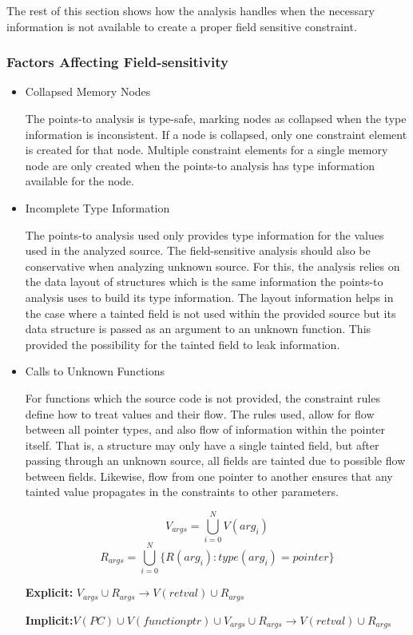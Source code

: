  The rest of this section shows how the analysis handles when the necessary
 information is not available to create a proper field sensitive constraint.

\subsubsection{Factors Affecting Field-sensitivity}
\begin{itemize}
\item{Collapsed Memory Nodes}

   The points-to analysis is type-safe, marking nodes as collapsed when the type
   information is inconsistent. If a node is collapsed, only one constraint
   element is created for that node. Multiple constraint elements for a single
   memory node are only created when the points-to analysis has type information
   available for the node.

\item{Incomplete Type Information}

   The points-to analysis used only provides type information for the values used
   in the analyzed source. The field-sensitive analysis should also be
   conservative when analyzing unknown source. For this, the analysis relies on
   the data layout of structures which is the same information the points-to
   analysis uses to build its type information. The layout information helps in
   the case where a tainted field is not used within the provided source but its
   data structure is passed as an argument to an unknown function. This provided
   the possibility for the tainted field to leak information.

\item{Calls to Unknown Functions}

For functions which the source code is not provided, the constraint rules define
how to treat values and their flow. The rules used, allow for flow between all
pointer types, and also flow of information within the pointer itself. That is,
a structure may only have a single tainted field, but after passing through an
unknown source, all fields are tainted due to possible flow between fields.
Likewise, flow from one pointer to another ensures that any tainted value
propagates in the constraints to other parameters.

\[V_{args} = \bigcup_{i=0}^N V(arg_i)\]
\[R_{args} = \bigcup_{i=0}^{N}\{R(arg_i) : type(arg_i) = pointer\}\]

\noindent
\textbf{Explicit:} $V_{args} \cup R_{args} \rightarrow V(retval) \cup R_{args}$

\noindent
\textbf{Implicit:}$V(PC) \cup V(functionptr) \cup V_{args} \cup R_{args} \rightarrow V(retval) \cup R_{args}$
\end{itemize}

